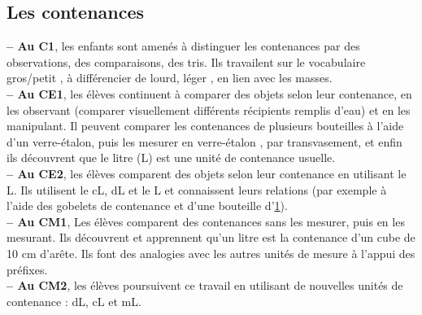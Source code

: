 {\subsection{Les contenances} %

{\bf -- Au C1}, les enfants sont amenés à distinguer les contenances par des observations, des comparaisons, des tris. Ils travailent sur le vocabulaire \og gros/petit \fg, à différencier de \og lourd, léger \fg, en lien avec les masses. \\
{\bf -- Au CE1}, les élèves continuent à comparer des objets selon leur contenance, en les observant (comparer \og visuellement \fg{} différents récipients remplis d'eau) et en les manipulant. Il peuvent comparer les contenances de plusieurs bouteilles à l'aide d'un verre-étalon, puis les mesurer en \og verre-étalon \fg, par transvasement, et enfin ils découvrent que le litre (L) est une unité de contenance usuelle. \\
{\bf -- Au CE2}, les élèves comparent des objets selon leur contenance en utilisant le L. Ils utilisent le cL, dL et le L et connaissent leurs relations (par exemple à l'aide des gobelets de contenance  et d'une bouteille d'\ul{1}). \\
{\bf -- Au CM1}, Les élèves comparent des contenances sans les mesurer, puis en les mesurant. Ils découvrent et apprennent qu’un litre est la contenance d’un cube de 10 cm d’arête. Ils font des analogies avec les autres unités de mesure à l’appui des préfixes. \\
{\bf -- Au CM2}, les élèves poursuivent ce travail en utilisant de nouvelles unités de contenance : dL, cL et mL. \medskip

}
